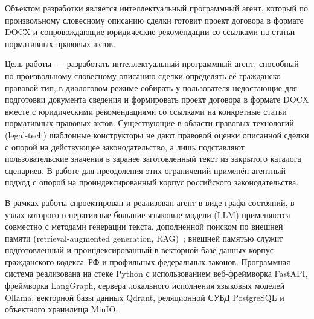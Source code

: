 \abstract %


Объектом разработки является интеллектуальный программный агент, который по произвольному словесному описанию сделки готовит проект договора в формате DOCX и сопровождающие юридические рекомендации со ссылками на статьи нормативных правовых актов.

Цель работы~--- разработать интеллектуальный программный агент, способный по произвольному словесному описанию сделки определять её гражданско-правовой тип, в диалоговом режиме собирать у пользователя недостающие для подготовки документа сведения и формировать проект договора в формате DOCX вместе с юридическими рекомендациями со ссылками на конкретные статьи нормативных правовых актов. Существующие в области правовых технологий (legal-tech) шаблонные конструкторы не дают правовой оценки описанной сделки с опорой на действующее законодательство, а лишь подставляют пользовательские значения в заранее заготовленный текст из закрытого каталога сценариев. В работе для преодоления этих ограничений применён агентный подход с опорой на проиндексированный корпус российского законодательства.

В рамках работы спроектирован и реализован агент в виде графа состояний, в узлах которого генеративные большие языковые модели (LLM) применяются совместно с методами генерации текста, дополненной поиском по внешней памяти (retrieval-augmented generation, RAG)~\cite{lewis2020rag}; внешней памятью служит подготовленный и проиндексированный в векторной базе данных корпус гражданского кодекса~РФ и профильных федеральных законов. Программная система реализована на стеке Python с использованием веб-фреймворка FastAPI, фреймворка LangGraph, сервера локального исполнения языковых моделей Ollama, векторной базы данных Qdrant, реляционной СУБД PostgreSQL и объектного хранилища MinIO.


